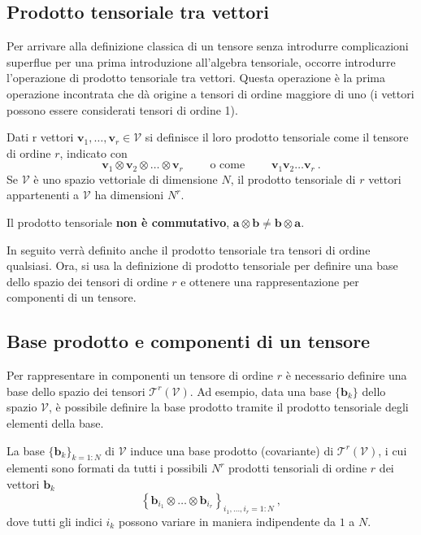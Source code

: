 \subsection{Prodotto tensoriale tra vettori}
Per arrivare alla definizione classica di un tensore senza introdurre complicazioni superflue per una prima introduzione all'algebra tensoriale, occorre introdurre l'operazione di prodotto tensoriale tra vettori. Questa operazione è la prima operazione incontrata che dà origine a tensori di ordine maggiore di uno (i vettori possono essere considerati tensori di ordine 1).

\begin{definition} Dati r vettori $\bm{v}_1,\dots,\bm{v}_r \in \mathcal{V}$ si definisce il loro prodotto tensoriale come il tensore di ordine $r$, indicato con
\begin{equation}
    \bm{v}_1 \otimes \bm{v}_2 \otimes \dots \otimes \bm{v}_r \qquad \text{ o come } \qquad  \bm{v}_1 \bm{v}_2 \dots \bm{v}_r  \ .
\end{equation}
 Se $\mathcal{V}$ è uno spazio vettoriale di dimensione $N$, il prodotto tensoriale di $r$ vettori appartenenti a $\mathcal{V}$ ha dimensioni $N^r$.
\end{definition}
\begin{remark}
 Il prodotto tensoriale \textbf{non è commutativo}, $\bm{a} \otimes \bm{b} \neq \bm{b} \otimes \bm{a}$.
\end{remark}
In seguito verrà definito anche il prodotto tensoriale tra tensori di ordine qualsiasi. Ora, si usa la definizione di prodotto tensoriale per definire una base dello spazio dei tensori di ordine $r$ e ottenere una rappresentazione per componenti di un tensore.

\subsection{Base prodotto e componenti di un tensore}
Per rappresentare in componenti un tensore di ordine $r$ è necessario definire una base dello spazio dei tensori $\mathcal{T}^r(\mathcal{V})$. Ad esempio, data una base $\{ \bm{b}_k \}$ dello spazio $\mathcal{V}$, è possibile definire la base prodotto tramite il prodotto tensoriale degli elementi della base.
\begin{definition}[Base prodotto di $\mathcal{T}^r(\mathcal{V})$] %
 La base $\{ \bm{b}_k \}_{k=1:N}$ di $\mathcal{V}$
    induce una base prodotto (covariante) di $\mathcal{T}^r(\mathcal{V})$, i cui elementi sono formati da tutti i possibili $N^r$ prodotti tensoriali di ordine $r$ dei vettori $\bm{b}_k$
\begin{equation}
  \left\{ \bm{b}_{i_1} \otimes \dots \otimes \bm{b}_{i_r} \right\}_{
  i_1,\dots,i_r = 1 : N} \ ,
\end{equation}
dove tutti gli indici $i_k$ possono variare in maniera indipendente da $1$ a $N$.
\end{definition}


